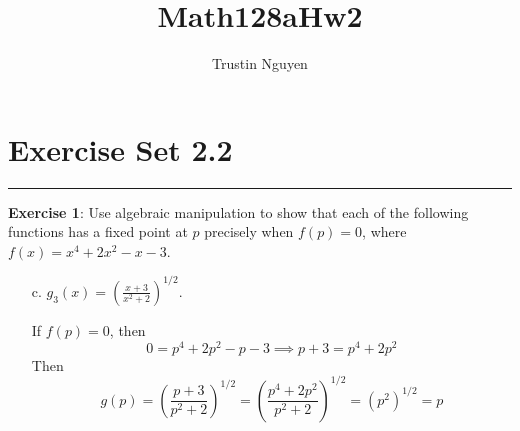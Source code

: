 \documentclass{article}
\title{Math128aHw2}
\author{Trustin Nguyen}
\begin{document}
    \maketitle

\reversemarginpar

\section*{Exercise Set 2.2}
\hrule

\textbf{Exercise 1}: Use algebraic manipulation to show that each of the following functions has a fixed point at $p$ precisely when $f(p) = 0$, where $f(x) = x^{4} + 2x^{2} - x - 3$.
    \begin{itemize}
        \item [c.] $g_{3}(x) = \left(\frac{x + 3}{x^{2} + 2}\right)^{1/2}$.
            \begin{answer}
                If $f(p) = 0$, then
                    \begin{equation*}
                        0 = p^{4} + 2p^{2} - p - 3 \implies p + 3 = p^{4} + 2p^{2}
                    \end{equation*}
                Then
                    \begin{equation*}
                        g(p) = \left(\dfrac{p + 3}{p^{2} + 2}\right)^{1/2} = \left(\dfrac{p^{4} + 2p^{2}}{p^{2} + 2}\right)^{1/2} = (p^{2})^{1/2} = p
                    \end{equation*}
            \end{answer}
    \end{itemize}
\end{document}
